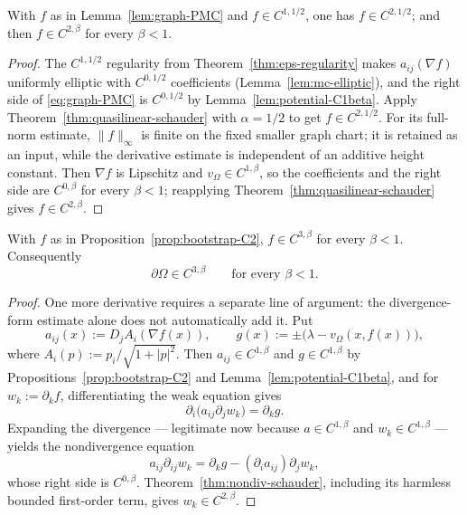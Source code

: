 \begin{proposition}
\label{prop:bootstrap-C2}
With $f$ as in Lemma~\ref{lem:graph-PMC} and $f\in C^{1,1/2}$, one has
$f\in C^{2,1/2}$; and then $f\in C^{2,\beta}$ for every $\beta<1$.
\end{proposition}

\begin{proof}
The $C^{1,1/2}$ regularity from Theorem~\ref{thm:eps-regularity} makes
$a_{ij}(\nabla f)$ uniformly elliptic with $C^{0,1/2}$ coefficients
(Lemma~\ref{lem:mc-elliptic}), and the right side of \eqref{eq:graph-PMC} is
$C^{0,1/2}$ by Lemma~\ref{lem:potential-C1beta}.  Apply
Theorem~\ref{thm:quasilinear-schauder} with $\alpha=1/2$ to get
$f\in C^{2,1/2}$.  For its full-norm estimate, $\|f\|_\infty$ is finite on
the fixed smaller graph chart; it is retained as an input, while the
derivative estimate is independent of an additive height constant.
Then $\nabla f$ is Lipschitz and
$v_\Omega\in C^{1,\beta}$, so the coefficients and the right side are
$C^{0,\beta}$ for every $\beta<1$; reapplying
Theorem~\ref{thm:quasilinear-schauder} gives $f\in C^{2,\beta}$.
\end{proof}

\begin{proposition}\label{prop:bootstrap-C3}
With $f$ as in Proposition~\ref{prop:bootstrap-C2}, $f\in C^{3,\beta}$ for
every $\beta<1$.  Consequently
\begin{equation}\label{eq:C3-boundary}
  \partial\Omega\in C^{3,\beta}\qquad\text{for every }\beta<1 .
\end{equation}
\end{proposition}

\begin{proof}
One more derivative requires a separate line of argument: the divergence-form
estimate alone does not automatically add it.  Put
\[
  a_{ij}(x):=D_jA_i(\nabla f(x)),
  \qquad
  g(x):=\pm\bigl(\lambda-v_\Omega(x,f(x))\bigr),
\]
where $A_i(p):=p_i/\sqrt{1+|p|^2}$.  Then $a_{ij}\in C^{1,\beta}$ and
$g\in C^{1,\beta}$ by Propositions~\ref{prop:bootstrap-C2} and
Lemma~\ref{lem:potential-C1beta}, and for $w_k:=\partial_kf$,
differentiating the weak equation gives
\begin{equation}\label{eq:bootstrap-div}
  \partial_i\bigl(a_{ij}\partial_jw_k\bigr)=\partial_kg .
\end{equation}
Expanding the divergence --- legitimate now because $a\in C^{1,\beta}$ and
$w_k\in C^{1,\beta}$ --- yields the nondivergence equation
\begin{equation}\label{eq:bootstrap-nondiv}
  a_{ij}\partial_{ij}w_k=\partial_kg-(\partial_ia_{ij})\partial_jw_k ,
\end{equation}
whose right side is $C^{0,\beta}$.  Theorem~\ref{thm:nondiv-schauder},
including its harmless bounded first-order term, gives
$w_k\in C^{2,\beta}$.
\end{proof}

